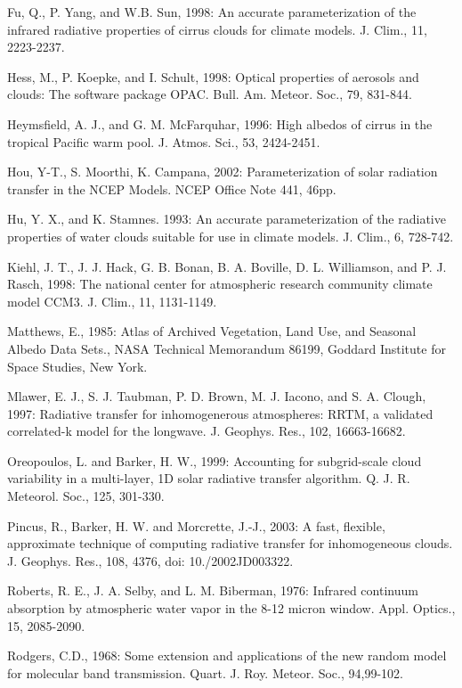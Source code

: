 Fu, Q., P. Yang, and W.\+B. Sun, 1998\+: An accurate parameterization of the infrared radiative properties of cirrus clouds for climate models. J. Clim., 11, 2223-\/2237.

Hess, M., P. Koepke, and I. Schult, 1998\+: Optical properties of aerosols and clouds\+: The software package O\+P\+AC. Bull. Am. Meteor. Soc., 79, 831-\/844.

Heymsfield, A. J., and G. M. Mc\+Farquhar, 1996\+: High albedos of cirrus in the tropical Pacific warm pool. J. Atmos. Sci., 53, 2424-\/2451.

Hou, Y-\/T., S. Moorthi, K. Campana, 2002\+: Parameterization of solar radiation transfer in the N\+C\+EP Models. N\+C\+EP Office Note 441, 46pp.

Hu, Y. X., and K. Stamnes. 1993\+: An accurate parameterization of the radiative properties of water clouds suitable for use in climate models. J. Clim., 6, 728-\/742.

Kiehl, J. T., J. J. Hack, G. B. Bonan, B. A. Boville, D. L. Williamson, and P. J. Rasch, 1998\+: The national center for atmospheric research community climate model C\+C\+M3. J. Clim., 11, 1131-\/1149.

Matthews, E., 1985\+: Atlas of Archived Vegetation, Land Use, and Seasonal Albedo Data Sets., N\+A\+SA Technical Memorandum 86199, Goddard Institute for Space Studies, New York.

Mlawer, E. J., S. J. Taubman, P. D. Brown, M. J. Iacono, and S. A. Clough, 1997\+: Radiative transfer for inhomogenerous atmospheres\+: R\+R\+TM, a validated correlated-\/k model for the longwave. J. Geophys. Res., 102, 16663-\/16682.

Oreopoulos, L. and Barker, H. W., 1999\+: Accounting for subgrid-\/scale cloud variability in a multi-\/layer, 1D solar radiative transfer algorithm. Q. J. R. Meteorol. Soc., 125, 301-\/330.

Pincus, R., Barker, H. W. and Morcrette, J.-\/J., 2003\+: A fast, flexible, approximate technique of computing radiative transfer for inhomogeneous clouds. J. Geophys. Res., 108, 4376, doi\+: 10./2002\+J\+D003322.

Roberts, R. E., J. A. Selby, and L. M. Biberman, 1976\+: Infrared continuum absorption by atmospheric water vapor in the 8-\/12 micron window. Appl. Optics., 15, 2085-\/2090.

Rodgers, C.\+D., 1968\+: Some extension and applications of the new random model for molecular band transmission. Quart. J. Roy. Meteor. Soc., 94,99-\/102.


